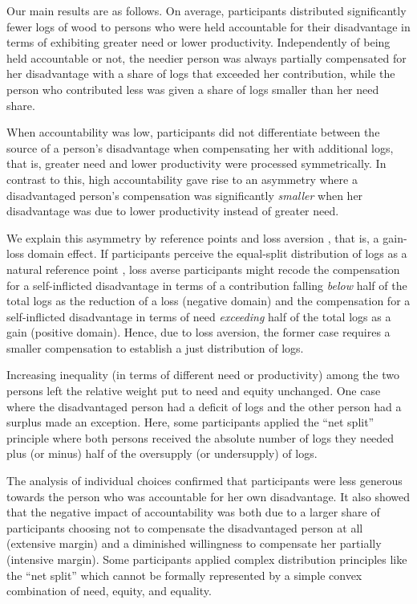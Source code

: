 \documentclass[smallcondensed]{svjour3}
\begin{document}
%
Our main results are as follows. On average, participants distributed significantly fewer logs of wood to persons who were held accountable for their disadvantage in terms of exhibiting greater need or lower productivity. Independently of being held accountable or not, the needier person was always partially compensated for her disadvantage with a share of logs that exceeded her contribution, while the person who contributed less was given a share of logs smaller than her need share.\par
%
When accountability was low, participants did not differentiate between the source of a person's disadvantage when compensating her with additional logs, that is, greater need and lower productivity were processed symmetrically. In contrast to this, high accountability gave rise to an asymmetry where a disadvantaged person's compensation was significantly \textit{smaller} when her disadvantage was due to lower productivity instead of greater need.\par
%
We explain this asymmetry by reference points and loss aversion \citep{tversky_loss_1991}, that is, a gain-loss domain effect. If participants perceive the equal-split distribution of logs as a natural reference point \citep{yaari_dividing_1984}, loss averse participants might recode the compensation for a self-inflicted disadvantage in terms of a contribution falling \textit{below} half of the total logs as the reduction of a loss (negative domain) and the compensation for a self-inflicted disadvantage in terms of need \textit{exceeding} half of the total logs as a gain (positive domain). Hence, due to loss aversion, the former case requires a smaller compensation to establish a just distribution of logs.\par
%
Increasing inequality (in terms of different need or productivity) among the two persons left the relative weight put to need and equity unchanged. One case where the disadvantaged person had a deficit of logs and the other person had a surplus made an exception. Here, some participants applied the ``net split'' principle where both persons received the absolute number of logs they needed plus (or minus) half of the oversupply (or undersupply) of logs.\par
%
The analysis of individual choices confirmed that participants were less generous towards the person who was accountable for her own disadvantage. It also showed that the negative impact of accountability was both due to a larger share of participants choosing not to compensate the disadvantaged person at all (extensive margin) and a diminished willingness to compensate her partially (intensive margin). Some participants applied complex distribution principles like the ``net split'' which cannot be formally represented by a simple convex combination of need, equity, and equality.\par
\end{document}
